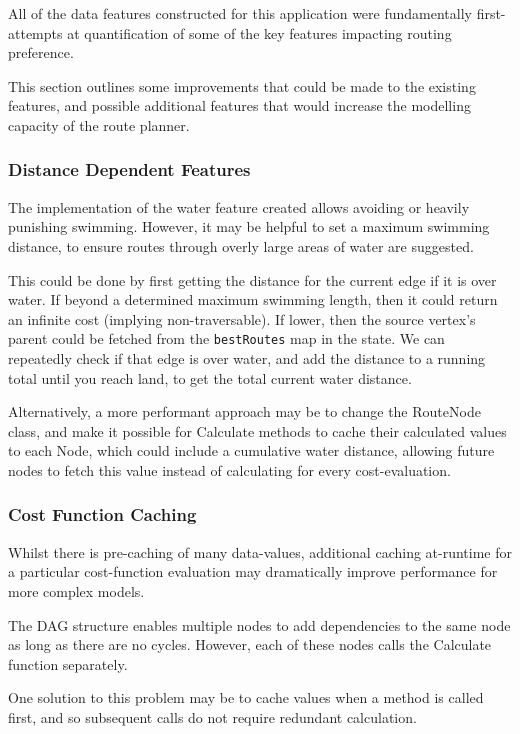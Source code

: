 \documentclass[12pt]{article}
\begin{document}
All of the data features constructed for this application were fundamentally first-attempts at quantification of some of the key features impacting routing preference.

This section outlines some improvements that could be made to the existing features, and possible additional features that would increase the modelling capacity of the route planner.

\subsubsection{Distance Dependent Features}

The implementation of the water feature created allows avoiding or heavily punishing swimming. However, it may be helpful to set a maximum swimming distance, to ensure routes through overly large areas of water are suggested.

This could be done by first getting the distance for the current edge if it is over water. If beyond a determined maximum swimming length, then it could return an infinite cost (implying non-traversable). If lower, then the source vertex's parent could be fetched from the \texttt{bestRoutes} map in the state. We can repeatedly check if that edge is over water, and add the distance to a running total until you reach land, to get the total current water distance.

Alternatively, a more performant approach may be to change the RouteNode class, and make it possible for Calculate methods to cache their calculated values to each Node, which could include a cumulative water distance, allowing future nodes to fetch this value instead of calculating for every cost-evaluation.

\subsubsection{Cost Function Caching}

Whilst there is pre-caching of many data-values, additional caching at-runtime for a particular cost-function evaluation may dramatically improve performance for more complex models.

The DAG structure enables multiple nodes to add dependencies to the same node as long as there are no cycles. However, each of these nodes calls the Calculate function separately.

One solution to this problem may be to cache values when a method is called first, and so subsequent calls do not require redundant calculation.
\end{document}
